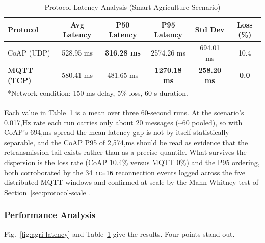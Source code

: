 \documentclass[jsan,article,submit,moreauthors,pdftex]{Definitions/mdpi}
\begin{document}
\begin{table}[t]
\centering
\caption{Protocol Latency Analysis (Smart Agriculture Scenario)}
\label{tab:agri-comp}
\begin{tabular}{l c c c c c}
\hline
\textbf{Protocol} & \textbf{Avg Latency} & \textbf{P50 Latency} & \textbf{P95 Latency} & \textbf{Std Dev} & \textbf{Loss (\%)} \\ \hline
CoAP (UDP) & 528.95 ms & \textbf{316.28 ms} & 2574.26 ms & 694.01 ms & 10.4 \\
\textbf{MQTT (TCP)} & 580.41 ms & 481.65 ms & \textbf{1270.18 ms} & \textbf{258.20 ms} & \textbf{0.0} \\
\hline
\multicolumn{6}{l}{\footnotesize{*Network condition: 150 ms delay, 5\% loss, 60 s duration.}}
\end{tabular}
\end{table}
Each value in Table~\ref{tab:agri-comp} is a mean over three 60-second runs. At the scenario's 0.017,Hz rate each run carries only about 20 messages (\textasciitilde60 pooled), so with CoAP's 694,ms spread the mean-latency gap is not by itself statistically separable, and the CoAP P95 of 2{,}574,ms should be read as evidence that the retransmission tail exists rather than as a precise quantile. What survives the dispersion is the loss rate (CoAP 10.4\% versus MQTT 0\%) and the P95 ordering, both corroborated by the 34 \texttt{rc=16} reconnection events logged across the five distributed MQTT windows and confirmed at scale by the Mann-Whitney test of Section~\ref{sec:protocol-scale}.

\subsubsection*{Performance Analysis}
Fig.~\ref{fig:agri-latency} and Table~\ref{tab:agri-comp} give the results. Four points stand out.
\end{document}
